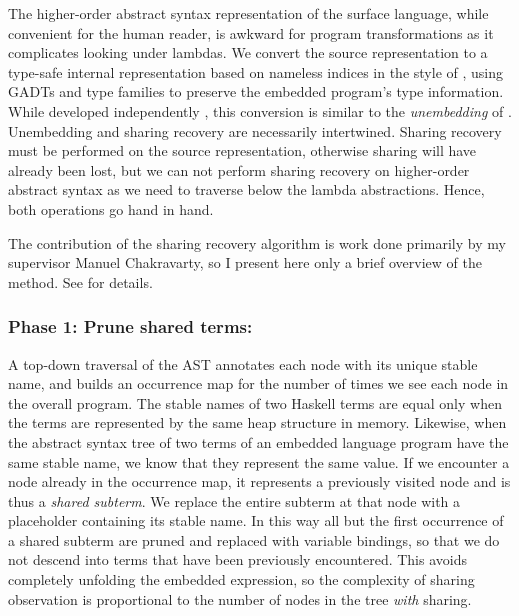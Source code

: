 The higher-order abstract syntax
representation of the surface language, while convenient for the human reader,
is awkward for program transformations as it complicates looking under lambdas.
We convert the source representation to a type-safe internal representation
based on nameless  indices in the style of
\citet{Altenkirch:2003kz}, using GADTs \cite{Jones:2006eh} and type families
\cite{Chakravarty:2005dx,Schrijvers:2008ir} to preserve the embedded program's
type information. While developed independently
\cite{McDonell:2013wi,Chakravarty:2009uo}, this conversion is similar to the
\emph{unembedding} of \citet{Atkey:2009dj}. Unembedding and sharing recovery are
necessarily intertwined. Sharing recovery must be performed on the source
representation, otherwise sharing will have already been lost, but we can not
perform sharing recovery on higher-order abstract syntax as we need to traverse below the lambda abstractions. Hence,
both operations go hand in hand.

The contribution of the sharing recovery algorithm is work done primarily by my supervisor Manuel
Chakravarty, so I present here only a brief overview of the method. See \cite{McDonell:2013wi} for
details.


\subsubsection*{Phase 1: Prune shared terms:}

A top-down traversal of the AST annotates each node
with its unique stable name, and builds an occurrence map for
the number of times we see each node in the overall program. The stable names of
two Haskell terms are equal only when the terms are represented by the same heap
structure in memory. Likewise, when the abstract syntax tree of two terms of an
embedded language program have the same stable name, we know that they represent
the same value. If we encounter a node already in the occurrence map, it represents a
previously visited node and is thus a \emph{shared subterm}. We replace the
entire subterm at that node with a placeholder containing its stable name. In
this way all but the first occurrence of a shared subterm are pruned and
replaced with variable bindings, so that we do not descend into terms that have
been previously encountered. This avoids completely unfolding the embedded
expression, so the complexity of sharing observation is proportional to the
number of nodes in the tree \emph{with} sharing.

